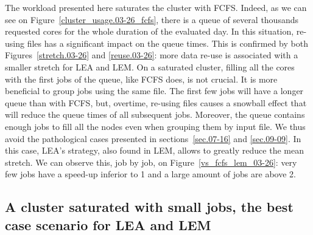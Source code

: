 \documentclass[conference,10pt]{IEEEtran}
\begin{document}
The workload presented here saturates the cluster with FCFS. 
Indeed, as we can see on Figure~\ref{cluster_usage.03-26_fcfs}, there is
a queue of several thousands requested cores
for the whole duration of the evaluated day.
In this situation, re-using files has a significant impact
on the queue times. This is confirmed by both Figures~\ref{stretch.03-26} and \ref{reuse.03-26}:
more data re-use is associated with a smaller stretch for LEA and LEM.
On a saturated cluster, filling all the cores with the first jobs of the queue, like FCFS does, is not crucial.
It is more beneficial to group jobs using the same file.
The first few jobs will have a longer queue than with FCFS,
but, overtime, re-using files causes a snowball effect that will reduce the 
queue times of all subsequent jobs.
Moreover, the queue contains enough jobs to fill all the nodes even when grouping them by input file.
We thus avoid the pathological cases presented in sections~\ref{sec.07-16} and \ref{sec.09-09}.
In this case, LEA's strategy, also found in LEM, allows to greatly reduce the mean stretch.
We can observe this, job by job, on Figure~\ref{vs_fcfs_lem_03-26}: very few jobs 
have a speed-up inferior to 1 and a large amount of jobs are above 2. 

\subsection{A cluster saturated with small jobs, the best case scenario for LEA and LEM}\label{sec.08-16}
\end{document}
